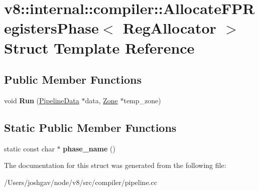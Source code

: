\hypertarget{structv8_1_1internal_1_1compiler_1_1_allocate_f_p_registers_phase}{}\section{v8\+:\+:internal\+:\+:compiler\+:\+:Allocate\+F\+P\+Registers\+Phase$<$ Reg\+Allocator $>$ Struct Template Reference}
\label{structv8_1_1internal_1_1compiler_1_1_allocate_f_p_registers_phase}
\subsection*{Public Member Functions}
\begin{DoxyCompactItemize}
\item 
void {\bfseries Run} (\hyperlink{classv8_1_1internal_1_1compiler_1_1_pipeline_data}{Pipeline\+Data} $\ast$data, \hyperlink{classv8_1_1internal_1_1_zone}{Zone} $\ast$temp\+\_\+zone)\hypertarget{structv8_1_1internal_1_1compiler_1_1_allocate_f_p_registers_phase_a4c6dd764c8c48b49f8ecd1e1035f5079}{}\label{structv8_1_1internal_1_1compiler_1_1_allocate_f_p_registers_phase_a4c6dd764c8c48b49f8ecd1e1035f5079}

\end{DoxyCompactItemize}
\subsection*{Static Public Member Functions}
\begin{DoxyCompactItemize}
\item 
static const char $\ast$ {\bfseries phase\+\_\+name} ()\hypertarget{structv8_1_1internal_1_1compiler_1_1_allocate_f_p_registers_phase_a29ced843c54c50d3169abe3aaa193858}{}\label{structv8_1_1internal_1_1compiler_1_1_allocate_f_p_registers_phase_a29ced843c54c50d3169abe3aaa193858}

\end{DoxyCompactItemize}


The documentation for this struct was generated from the following file\+:\begin{DoxyCompactItemize}
\item 
/\+Users/joshgav/node/v8/src/compiler/pipeline.\+cc\end{DoxyCompactItemize}
